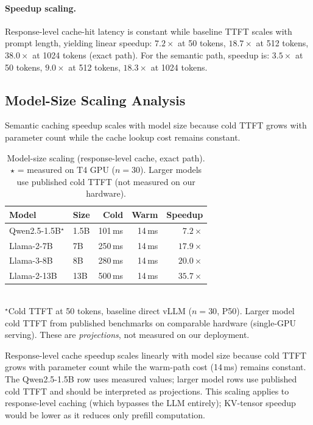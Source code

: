 \documentclass[11pt,twocolumn]{article}
\begin{document}
\paragraph{Speedup scaling.} Response-level cache-hit latency is
constant while baseline TTFT scales with prompt length, yielding linear
speedup: $7.2\times$ at 50 tokens, $18.7\times$ at 512 tokens,
$38.0\times$ at 1024 tokens (exact path). For the semantic path,
speedup is: $3.5\times$ at 50 tokens, $9.0\times$ at 512 tokens,
$18.3\times$ at 1024 tokens.


\subsection{Model-Size Scaling Analysis}
\label{sec:scaling}

Semantic caching speedup scales with model size because cold TTFT
grows with parameter count while the cache lookup cost remains constant.

\begin{table}[t]
\centering
\caption{Model-size scaling (response-level cache, exact path).
$\star$ = measured on T4 GPU ($n{=}30$). Larger models use published
cold TTFT (not measured on our hardware).}
\label{tab:projection}
\scriptsize
\setlength{\tabcolsep}{2.5pt}
\begin{tabular}{@{}llrrr@{}}
\toprule
\textbf{Model} & \textbf{Size} & \textbf{Cold} & \textbf{Warm} & \textbf{Speedup} \\
\midrule
Qwen2.5-1.5B$^\star$ & 1.5B & 101\,ms  & 14\,ms & $7.2\times$ \\
Llama-2-7B           & 7B   & 250\,ms  & 14\,ms & $17.9\times$ \\
Llama-3-8B           & 8B   & 280\,ms  & 14\,ms & $20.0\times$ \\
Llama-2-13B          & 13B  & 500\,ms  & 14\,ms & $35.7\times$ \\
\bottomrule
\end{tabular}\\[2pt]
{\footnotesize $^\star$Cold TTFT at 50 tokens, baseline direct vLLM
($n{=}30$, P50). Larger model cold TTFT from published benchmarks on
comparable hardware (single-GPU serving). These are \emph{projections},
not measured on our deployment.}
\end{table}

Response-level cache speedup scales linearly with model size because
cold TTFT grows with parameter count while the warm-path cost (14\,ms)
remains constant. The Qwen2.5-1.5B row uses measured values; larger
model rows use published cold TTFT and should be interpreted as
projections. This scaling applies to response-level caching (which
bypasses the LLM entirely); KV-tensor speedup would be lower as it
reduces only prefill computation.
\end{document}
